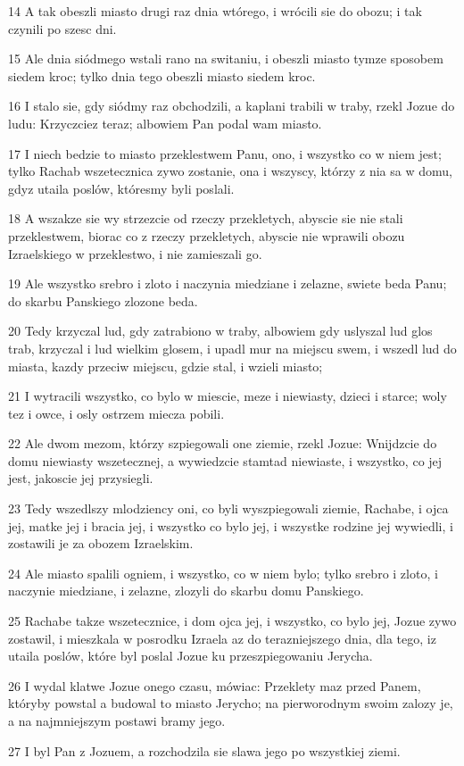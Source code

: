 \par 14 A tak obeszli miasto drugi raz dnia wtórego, i wrócili sie do obozu; i tak czynili po szesc dni.
\par 15 Ale dnia siódmego wstali rano na switaniu, i obeszli miasto tymze sposobem siedem kroc; tylko dnia tego obeszli miasto siedem kroc.
\par 16 I stalo sie, gdy siódmy raz obchodzili, a kaplani trabili w traby, rzekl Jozue do ludu: Krzyczciez teraz; albowiem Pan podal wam miasto.
\par 17 I niech bedzie to miasto przeklestwem Panu, ono, i wszystko co w niem jest; tylko Rachab wszetecznica zywo zostanie, ona i wszyscy, którzy z nia sa w domu, gdyz utaila poslów, któresmy byli poslali.
\par 18 A wszakze sie wy strzezcie od rzeczy przekletych, abyscie sie nie stali przeklestwem, biorac co z rzeczy przekletych, abyscie nie wprawili obozu Izraelskiego w przeklestwo, i nie zamieszali go.
\par 19 Ale wszystko srebro i zloto i naczynia miedziane i zelazne, swiete beda Panu; do skarbu Panskiego zlozone beda.
\par 20 Tedy krzyczal lud, gdy zatrabiono w traby, albowiem gdy uslyszal lud glos trab, krzyczal i lud wielkim glosem, i upadl mur na miejscu swem, i wszedl lud do miasta, kazdy przeciw miejscu, gdzie stal, i wzieli miasto;
\par 21 I wytracili wszystko, co bylo w miescie, meze i niewiasty, dzieci i starce; woly tez i owce, i osly ostrzem miecza pobili.
\par 22 Ale dwom mezom, którzy szpiegowali one ziemie, rzekl Jozue: Wnijdzcie do domu niewiasty wszetecznej, a wywiedzcie stamtad niewiaste, i wszystko, co jej jest, jakoscie jej przysiegli.
\par 23 Tedy wszedlszy mlodziency oni, co byli wyszpiegowali ziemie, Rachabe, i ojca jej, matke jej i bracia jej, i wszystko co bylo jej, i wszystke rodzine jej wywiedli, i zostawili je za obozem Izraelskim.
\par 24 Ale miasto spalili ogniem, i wszystko, co w niem bylo; tylko srebro i zloto, i naczynie miedziane, i zelazne, zlozyli do skarbu domu Panskiego.
\par 25 Rachabe takze wszetecznice, i dom ojca jej, i wszystko, co bylo jej, Jozue zywo zostawil, i mieszkala w posrodku Izraela az do terazniejszego dnia, dla tego, iz utaila poslów, które byl poslal Jozue ku przeszpiegowaniu Jerycha.
\par 26 I wydal klatwe Jozue onego czasu, mówiac: Przeklety maz przed Panem, któryby powstal a budowal to miasto Jerycho; na pierworodnym swoim zalozy je, a na najmniejszym postawi bramy jego.
\par 27 I byl Pan z Jozuem, a rozchodzila sie slawa jego po wszystkiej ziemi.


